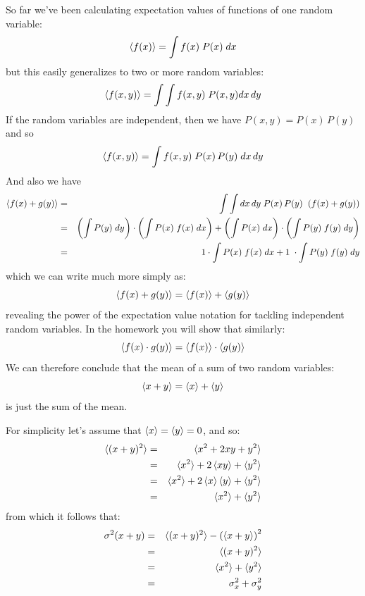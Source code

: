 \documentclass[12pt,oneside]{book}
\begin{document}
So far we've been calculating expectation values of functions of one random variable: 
\begin{displaymath}
\braket{f(x)} = \int f(x) \; P(x) \; dx
\end{displaymath}
but this easily generalizes to two or more random variables:
\begin{displaymath}
\braket{f(x,y)} = \int \int f(x,y) \; P(x,y) dx \, dy 
\end{displaymath}
If the random variables are independent, then we have $P(x,y) = P(x) \, P(y)$ and so
\begin{displaymath}
\braket{f(x,y)} = \int f(x,y) \; P(x) \, P(y) \; dx \, dy
\end{displaymath}
And also we have
\begin{eqnarray*}
\braket{f(x)+g(y)} &=& \int \int dx \, dy \; P(x) \, P(y) \;\; (f(x) + g(y)) \\
&=& \left(\int P(y) \; dy \right) \cdot \left( \int P(x) \; f(x) \; dx  \right) 
+ \left(\int P(x) \; dx \right) \cdot \left( \int P(y) \; f(y) \; dy  \right)\\
&=& 1 \cdot \int P(x) \; f(x) \; dx  + 1 \; \cdot \int P(y) \; f(y) \; dy \\
\end{eqnarray*}
which we can write much more simply as:
\begin{displaymath}
\braket{f(x)+g(y)} = \braket{f(x)}+\braket{g(y)}
\end{displaymath}
revealing the power of the expectation value notation for tackling independent random variables.  In the homework you will show that similarly:
\begin{equation}
\braket{f(x) \cdot g(y)} = \braket{f(x)} \cdot \braket{g(y)} \label{eqn:expprod}
\end{equation}
We can therefore conclude that the mean of a sum of two random variables:
\begin{displaymath}
\braket{x + y} = \braket{x} + \braket{y} 
\end{displaymath}
is just the sum of the mean.  

For simplicity let's assume that $\braket{x} = \braket{y} = 0$, and so:
\begin{eqnarray*}
\braket{(x + y)^2} &=& \braket{x^2 + 2xy + y^2} \\
&=& \braket{x^2} + 2\braket{xy} + \braket{y^2} \\
&=& \braket{x^2} + 2\braket{x}\braket{y} + \braket{y^2} \\
&=& \braket{x^2} + \braket{y^2} \\
\end{eqnarray*}
from which it follows that:
\begin{eqnarray*}
\sigma^2(x+y) &=& \braket{(x+y)^2} - \left( \braket{x+y} \right) ^2\\
&=& \braket{(x+y)^2}\\
&=& \braket{x^2} + \braket{y^2} \\
&=& \sigma^2_x + \sigma^2_y\\
\end{eqnarray*}
\end{document}
